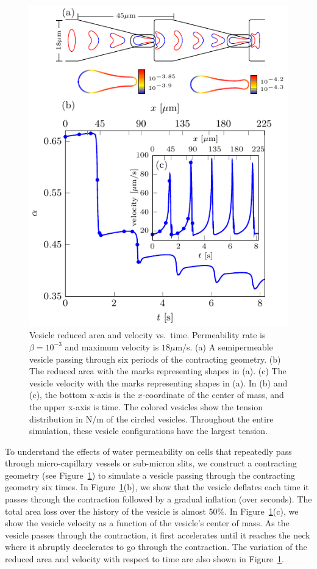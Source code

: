 \documentclass[9pt,twocolumn,twoside,lineno]{pnas-new}
\newif\ifTikz
\begin{document}
\begin{figure}[htp]
  \centering
  \ifTikz
  
  \else
  \includegraphics{figures/contractingComposite2.pdf}
  \fi
  \caption{\label{fig:contractingComposite2} Vesicle reduced area and
  velocity vs.~time. Permeability rate is $\beta = 10^{-3}$ and maximum
  velocity is $18\mu$m/s. (a) A semipermeable vesicle passing through
  six periods of the contracting geometry. (b) The reduced area with
  the marks representing shapes in (a). (c) The vesicle velocity with
  the marks representing shapes in (a). In (b) and (c), the bottom
  x-axis is the $x$-coordinate of the center of mass, and the upper
  x-axis is time. The colored vesicles show the tension distribution in
  N/m of the circled vesicles. Throughout the entire simulation, these
  vesicle configurations have the largest tension.}
\end{figure}

To understand the effects of water permeability on cells that repeatedly
pass through micro-capillary vessels or sub-micron slits, we construct a
contracting geometry (see Figure~\ref{fig:contractingComposite2}) to
simulate a vesicle passing through the contracting geometry six times.
In Figure~\ref{fig:contractingComposite2}(b), we show that the vesicle
deflates each time it passes through the contraction followed by a
gradual inflation (over seconds). The total area loss over the history
of the vesicle is almost 50\%. In
Figure~\ref{fig:contractingComposite2}(c), we show the vesicle velocity
as a function of the vesicle's center of mass. As the vesicle passes
through the contraction, it first accelerates until it reaches the neck
where it abruptly decelerates to go through the contraction. The
variation of the reduced area and velocity with respect to time are also
shown in Figure~\ref{fig:contractingComposite2}.
\end{document}
